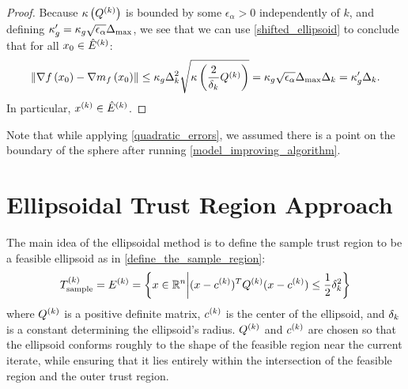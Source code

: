 \begin{proof}

Because ${\kappa} \left({Q^{(k)}}\right)$ is bounded by some $\epsilon_{\alpha} > 0$ independently of $k$, 
and defining $\kappa'_{g} =  \kappa_g\sqrt{\epsilon_{\alpha}}{\Delta_{\textrm{max}}}$, we see that
we can use  \cref{shifted_ellipsoid} to conclude that for all $x_0 \in {{\hat E}^{(k)}}$:
\begin{align*}
\left\|\nabla f\left(x_0 \right) - \nabla m_f\left(x_0\right)\right\| \le 
\kappa_g  \Delta_k^2 \sqrt{{\kappa} \left(\frac 2 {\delta_k} Q^{(k)}\right)}
=  \kappa_g \sqrt{\epsilon_{\alpha}}{\Delta_{\textrm{max}}}\Delta_k 
= \kappa'_g\Delta_k.
\end{align*}
In particular, $x^{(k)} \in {{\hat E}^{(k)}}$.
\end{proof}

\color{red}
Note that while applying \cref{quadratic_errors}, we assumed there is a point on the boundary of the sphere after running
\cref{model_improving_algorithm}.
\color{black}




\section{Ellipsoidal Trust Region Approach}\label{sec:ellipsoidal}

The main idea of the ellipsoidal method is to define the sample trust region to be a feasible ellipsoid as in \cref{define_the_sample_region}:
\begin{align*}
{T_{\text{sample}}^{(k)}} = {E^{(k)}} = \left\{x \in \mathbb R^n \bigg | (x - c^{(k)})^T {Q^{(k)}} (x - c^{(k)}) \le \frac 1 2 \delta_k^2 \right\}
\end{align*}
where ${Q^{(k)}}$ is a positive definite matrix, $c^{(k)}$ is the center of the ellipsoid, and $\delta_k$ is a constant determining the ellipsoid's radius.   
${Q^{(k)}}$ and $c^{(k)}$ are chosen so that the ellipsoid conforms roughly to the shape of the feasible region near the current iterate, 
while ensuring that it lies entirely within the intersection of the feasible region and the outer trust region.

